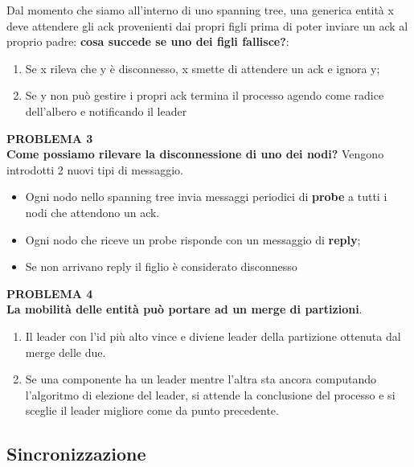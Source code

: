 \documentclass[12pt]{article}
\begin{document}
			Dal momento che siamo all'interno di uno spanning tree, una generica entità x deve attendere gli ack provenienti dai propri figli prima di poter inviare un ack al proprio padre: \textbf{cosa succede se uno dei figli fallisce?}:
			\begin{enumerate}
				\item Se x rileva che y è disconnesso, x smette di attendere un ack e ignora y;
				\item Se y non può gestire i propri ack termina il processo agendo come radice dell'albero e notificando il leader
			\end{enumerate}
			\textbf{PROBLEMA 3}\\
			\textbf{Come possiamo rilevare la disconnessione di uno dei nodi?} Vengono introdotti 2 nuovi tipi di messaggio.
			\begin{itemize}
				\item Ogni nodo nello spanning tree invia messaggi periodici di \textbf{probe} a tutti i nodi che attendono un ack.
				\item Ogni nodo che riceve un probe risponde con un messaggio di \textbf{reply};
				\item Se non arrivano reply il figlio è considerato disconnesso
			\end{itemize} 
			\textbf{PROBLEMA 4}\\
			\textbf{La mobilità delle entità può portare ad un merge di partizioni}.
			\begin{enumerate}
				\item Il leader con l'id più alto vince e diviene leader della partizione ottenuta dal merge delle due.
				\item Se una componente ha un leader mentre l'altra sta ancora computando l'algoritmo di elezione del leader, si attende la conclusione del processo e si sceglie il leader migliore come da punto precedente.
			\end{enumerate}
	\subsection{Sincronizzazione}
\end{document}
